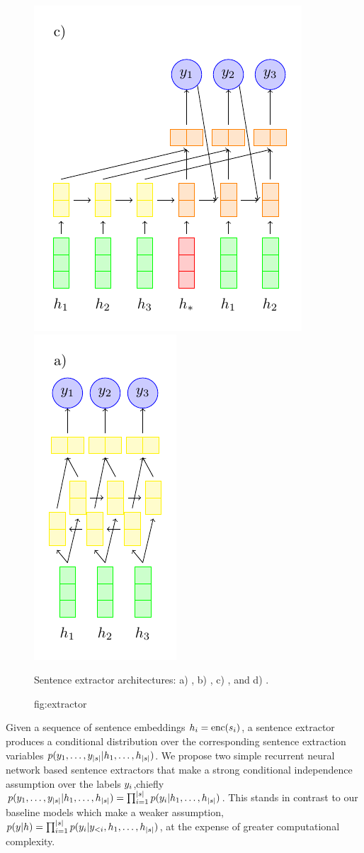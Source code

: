 \begin{figure}
  \includegraphics[scale=.7]{figures/clextractor.pdf}
  \includegraphics[scale=.7]{figures/rnnextractor.pdf}
  \caption{Sentence extractor architectures: a) \modelOneBF, b) \modelTwoBF,
            c) \baselineOneBF, and d) \baselineTwoBF. }
  \caption{fig:extractor}
\end{figure}


Given a sequence of sentence embeddings $h_i = \operatorname{enc}(s_i)$,
a sentence extractor produces a conditional distribution over the 
corresponding sentence extraction variables 
$p(y_1,\ldots,y_{|s|}|h_1, \ldots, h_{|s|})$.
We propose two simple recurrent neural network based sentence extractors
that make a strong conditional independence assumption over the labels
$y_i$,chiefly 
$p(y_1,\ldots,y_{|s|}| h_1, \ldots, h_{|s|})= \prod_{i=1}^{|s|}p(y_i| h_1, \ldots, h_{|s|})$. This stands in contrast to our 
baseline models which make a weaker assumption, 
$p(y|h) = \prod_{i=1}^{|s|} p(y_i|y_{<i}, h_1, \ldots, h_{|s|})$, at the expense of greater 
computational complexity. 


